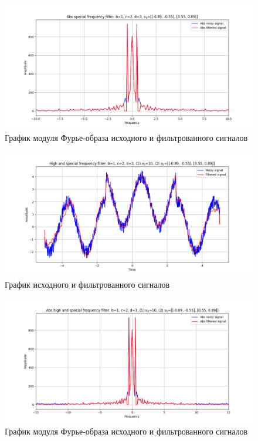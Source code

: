 \documentclass[a4paper, 12pt]{article}
\begin{document}
    \begin{figure}[!htb]
        \centering
        \includegraphics[scale=0.485]{6_1_abs_u_U_nospec.png}
        \captionsetup{skip=0pt}
        \caption{График модуля Фурье-образа исходного и фильтрованного сигналов}
        \label{fig:fig102}
    \end{figure}
    \begin{figure}[!htb]
        \centering
        \includegraphics[scale=0.485]{6_2_u_flt_u_nospec.png}
        \captionsetup{skip=0pt}
        \caption{График исходного и фильтрованного сигналов}
        \label{fig:fig103}
    \end{figure}
    \begin{figure}[!htb]
        \centering
        \includegraphics[scale=0.485]{6_2_abs_u_U_nospec.png}
        \captionsetup{skip=0pt}
        \caption{График модуля Фурье-образа исходного и фильтрованного сигналов}
        \label{fig:fig104}
    \end{figure}
\end{document}
